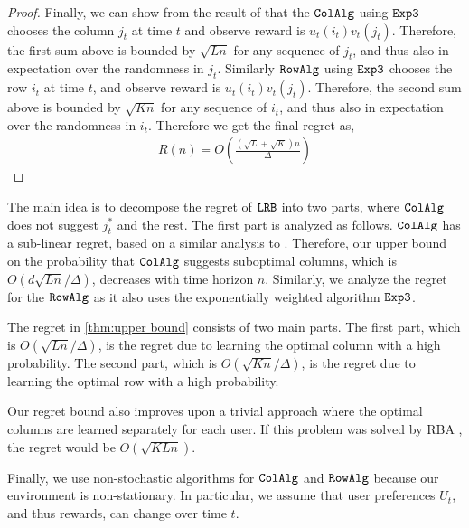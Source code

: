 \begin{proof}
Finally, we can show from the result of \citet{auer2002nonstochastic} that the ${\tt ColAlg}$ using ${\tt Exp3}$ chooses the column $j_t$ at time $t$ and observe reward is $u_t(i_t) v_t(j_t)$. Therefore, the first sum above is bounded by $\sqrt{L n}$ for any sequence of $j_t$, and thus also in expectation over the randomness in $j_t$. Similarly ${\tt RowAlg}$ using ${\tt Exp3}$ chooses the row $i_t$ at time $t$, and observe reward is $u_t(i_t) v_t(j_t)$. Therefore, the second sum above is bounded by $\sqrt{K n}$ for any sequence of $i_t$, and thus also in expectation over the randomness in $i_t$. Therefore we get the final regret as,
\begin{align*}
  R(n) = O\left(\frac{\left(\sqrt{L } + \sqrt{K }\right)n}{\Delta}\right)
\end{align*}
\end{proof}


\begin{discussion}
The main idea is to decompose the regret of ${\tt LRB}$ into two parts, where ${\tt ColAlg}$ does not suggest $j^*_t$ and the rest. The first part is analyzed as follows. ${\tt ColAlg}$ has a sub-linear regret, based on a similar analysis to \citet{auer2002nonstochastic}. Therefore, our upper bound on the probability that ${\tt ColAlg}$ suggests suboptimal columns, which is $O(d \sqrt{L n} / \Delta)$, decreases with time horizon $n$. Similarly, we analyze the regret for the ${\tt RowAlg}$ as it also uses the exponentially weighted algorithm ${\tt Exp3}$.


The regret in \cref{thm:upper bound} consists of two main parts. The first part, which is $O(\sqrt{L n} / \Delta)$, is the regret due to learning the optimal column with a high probability. The second part, which is $O(\sqrt{K n} / \Delta)$, is the regret due to learning the optimal row with a high probability.

Our regret bound also improves upon a trivial approach where the optimal columns are learned separately for each user. If this problem was solved by RBA \citep{radlinski2008learning}, the regret would be $O(\sqrt{K L n})$.

Finally, we use non-stochastic algorithms for ${\tt ColAlg}$ and ${\tt RowAlg}$ because our environment is non-stationary. In particular, we assume that user preferences $U_t$, and thus rewards, can change over time $t$. 
\end{discussion}